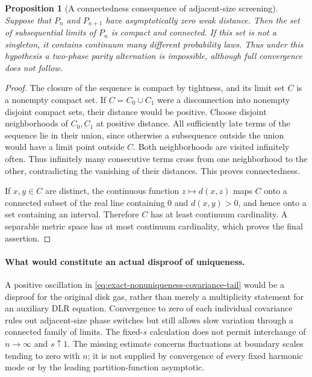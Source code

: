 \documentclass[11pt,a4paper]{article}
\numberwithin{equation}{section}
\newtheorem{proposition}[theorem]{Proposition}
\theoremstyle{definition}
\theoremstyle{remark}
\begin{document}
\begin{proposition}[A connectedness consequence of adjacent-size screening]
\label{prop:adjacent-screening-connected-limits}
Suppose that $P_n$ and $P_{n+1}$ have asymptotically zero weak distance.
Then the set of subsequential limits of $P_n$ is compact and connected.
If this set is not a singleton, it contains continuum many different
probability laws.  Thus under this hypothesis a two-phase parity
alternation is impossible, although full convergence does not follow.
\end{proposition}

\begin{proof}
The closure of the sequence is compact by tightness, and its limit
set $C$ is a nonempty compact set.  If $C=C_0\cup C_1$ were a
disconnection into nonempty disjoint compact sets, their distance
would be positive.  Choose disjoint neighborhoods of $C_0,C_1$
at positive distance.  All sufficiently late terms of the sequence
lie in their union, since otherwise a subsequence outside the union
would have a limit point outside $C$.  Both neighborhoods are visited
infinitely often.  Thus infinitely many consecutive terms cross from
one neighborhood to the other, contradicting the vanishing of their
distances.  This proves connectedness.

If $x,y\in C$ are distinct, the continuous function
$z\mapsto d(x,z)$ maps $C$ onto a connected subset of the real line
containing $0$ and $d(x,y)>0$, and hence onto a set containing an
interval.  Therefore $C$ has at least continuum cardinality.  A
separable metric space has at most continuum cardinality, which
proves the final assertion.
\end{proof}

\paragraph{What would constitute an actual disproof of uniqueness.}
A positive oscillation in
\eqref{eq:exact-nonuniqueness-covariance-tail} would be a disproof for the original disk gas, rather than merely
a multiplicity statement for an auxiliary DLR equation.  Convergence to zero of each individual covariance rules out adjacent-size phase
switches but still allows slow variation through a connected family
of limits.  The fixed-$s$ calculation does not permit interchange of
$n\to\infty$ and $s\uparrow1$.  The missing estimate concerns
fluctuations at boundary scales tending to zero with $n$; it is not
supplied by convergence of every fixed harmonic mode or by the
leading partition-function asymptotic.
\end{document}
